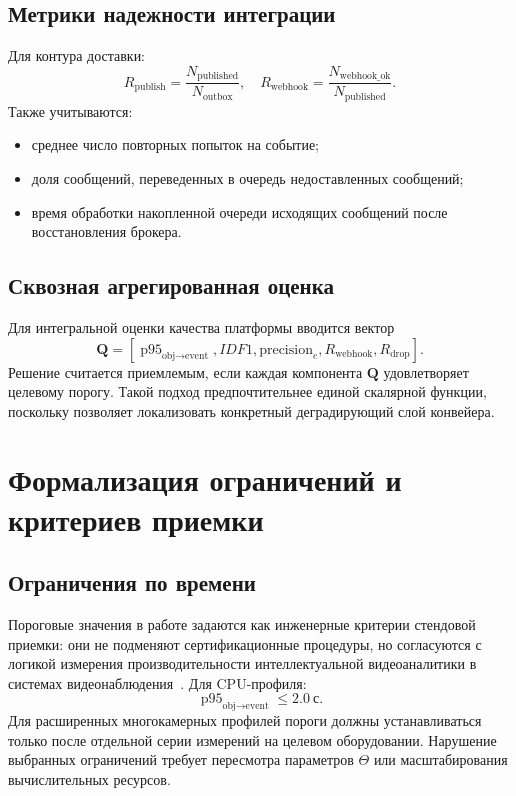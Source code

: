 \subsection{Метрики надежности интеграции}

Для контура доставки:
\begin{equation}
R_{\text{publish}} = \frac{N_{\text{published}}}{N_{\text{outbox}}}, \quad
R_{\text{webhook}} = \frac{N_{\text{webhook\_ok}}}{N_{\text{published}}}.
\end{equation}
Также учитываются:
\begin{itemize}
    \item среднее число повторных попыток на событие;
    \item доля сообщений, переведенных в очередь недоставленных сообщений;
    \item время обработки накопленной очереди исходящих сообщений после восстановления брокера.
\end{itemize}

\subsection{Сквозная агрегированная оценка}

Для интегральной оценки качества платформы вводится вектор
\begin{equation}
\mathbf{Q} = \left[
\operatorname{p95}_{\text{obj}\to\text{event}},
IDF1,
\text{precision}_e,
R_{\text{webhook}},
R_{\text{drop}}
\right].
\end{equation}
Решение считается приемлемым, если каждая компонента \(\mathbf{Q}\) удовлетворяет целевому порогу. Такой подход предпочтительнее единой скалярной функции, поскольку позволяет локализовать конкретный деградирующий слой конвейера.

\section{Формализация ограничений и критериев приемки}

\subsection{Ограничения по времени}

Пороговые значения в работе задаются как инженерные критерии стендовой приемки: они не подменяют сертификационные процедуры, но согласуются с логикой измерения производительности интеллектуальной видеоаналитики в системах видеонаблюдения~\cite{iec_62676_6_2026}. Для CPU-профиля:
\begin{equation}
\operatorname{p95}_{\text{obj}\to\text{event}} \le 2.0\ \text{с}.
\end{equation}
Для расширенных многокамерных профилей пороги должны устанавливаться только после отдельной серии измерений на целевом оборудовании. Нарушение выбранных ограничений требует пересмотра параметров \(\Theta\) или масштабирования вычислительных ресурсов.

